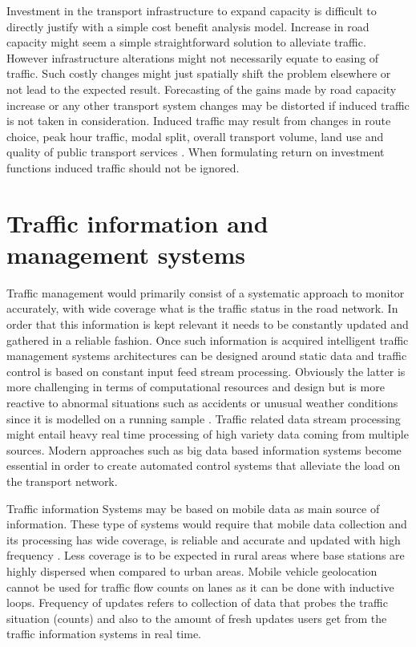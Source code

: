 \documentclass[12pt, a4paper]{report}
\theoremstyle{definition}
\theoremstyle{definition}%
\theoremstyle{definition}%
\theoremstyle{definition}%
\theoremstyle{definition}%
\theoremstyle{definition}%
\begin{document}
Investment in the transport infrastructure to expand capacity is difficult to directly justify with a simple cost benefit analysis model. Increase in road capacity might seem a simple straightforward solution to alleviate traffic.  However infrastructure alterations might not necessarily equate to easing of traffic. Such costly changes might just spatially shift the problem elsewhere or not lead to the expected result. Forecasting of the gains made by road capacity increase or any other transport system changes may be distorted if induced traffic is not taken in consideration. Induced traffic may result from changes in route choice, peak hour traffic, modal split, overall transport volume, land use and quality of public transport services \cite{Naess2012}. When formulating return on investment functions induced traffic should not be ignored.


\section{Traffic information and management systems}

Traffic management would primarily consist of a systematic approach to monitor accurately, with wide coverage what is the traffic status in the road network. In order that this information is kept relevant it needs to be constantly updated and gathered in a reliable fashion. Once such information is acquired intelligent traffic management systems architectures can be designed around static data and traffic control is based  on constant input feed stream processing. Obviously the latter is more challenging in terms of computational resources and design but is more reactive to abnormal situations such as accidents or unusual weather conditions since it is modelled on a running sample \cite{Toole2015}. Traffic related data stream processing might entail heavy real time processing of high variety data coming from multiple sources. Modern approaches such as big data based information systems become essential in order to create automated control systems that alleviate the load on the transport network.

Traffic information Systems may be based on mobile data as main source of information. These type of systems would require that mobile data collection and its processing has wide coverage, is reliable and accurate and updated with high frequency \cite{Leduc2008}. Less coverage is to be expected in rural areas where base stations are highly dispersed when compared to urban areas. Mobile vehicle geolocation cannot be used for traffic flow counts on lanes as it can be done with inductive loops. Frequency of updates refers to collection of data that probes the traffic situation (counts) and also to the amount of fresh updates users get from the traffic information systems in real time.
\end{document}
